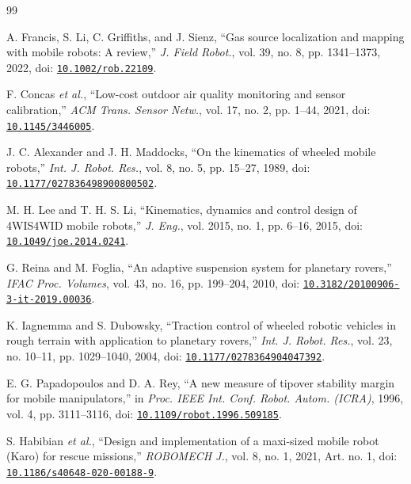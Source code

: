 \begin{thebibliography}{99}

A. Francis, S. Li, C. Griffiths, and J. Sienz, “Gas source localization and mapping with mobile robots: A review,” \textit{J. Field Robot.}, vol. 39, no. 8, pp. 1341--1373, 2022, doi: \href{https://doi.org/10.1002/rob.22109}{\nolinkurl{10.1002/rob.22109}}.

F. Concas \textit{et al.}, “Low-cost outdoor air quality monitoring and sensor calibration,” \textit{ACM Trans. Sensor Netw.}, vol. 17, no. 2, pp. 1--44, 2021, doi: \href{https://doi.org/10.1145/3446005}{\nolinkurl{10.1145/3446005}}.

J. C. Alexander and J. H. Maddocks, “On the kinematics of wheeled mobile robots,” \textit{Int. J. Robot. Res.}, vol. 8, no. 5, pp. 15--27, 1989, doi: \href{https://doi.org/10.1177/027836498900800502}{\nolinkurl{10.1177/027836498900800502}}.

M. H. Lee and T. H. S. Li, “Kinematics, dynamics and control design of 4WIS4WID mobile robots,” \textit{J. Eng.}, vol. 2015, no. 1, pp. 6--16, 2015, doi: \href{https://doi.org/10.1049/joe.2014.0241}{\nolinkurl{10.1049/joe.2014.0241}}.

G. Reina and M. Foglia, “An adaptive suspension system for planetary rovers,” \textit{IFAC Proc. Volumes}, vol. 43, no. 16, pp. 199--204, 2010, doi: \href{https://doi.org/10.3182/20100906-3-it-2019.00036}{\nolinkurl{10.3182/20100906-3-it-2019.00036}}.

K. Iagnemma and S. Dubowsky, “Traction control of wheeled robotic vehicles in rough terrain with application to planetary rovers,” \textit{Int. J. Robot. Res.}, vol. 23, no. 10--11, pp. 1029--1040, 2004, doi: \href{https://doi.org/10.1177/0278364904047392}{\nolinkurl{10.1177/0278364904047392}}.

E. G. Papadopoulos and D. A. Rey, “A new measure of tipover stability margin for mobile manipulators,” in \textit{Proc. IEEE Int. Conf. Robot. Autom. (ICRA)}, 1996, vol. 4, pp. 3111--3116, doi: \href{https://doi.org/10.1109/robot.1996.509185}{\nolinkurl{10.1109/robot.1996.509185}}.

S. Habibian \textit{et al.}, “Design and implementation of a maxi-sized mobile robot (Karo) for rescue missions,” \textit{ROBOMECH J.}, vol. 8, no. 1, 2021, Art. no. 1, doi: \href{https://doi.org/10.1186/s40648-020-00188-9}{\nolinkurl{10.1186/s40648-020-00188-9}}.


\end{thebibliography}
